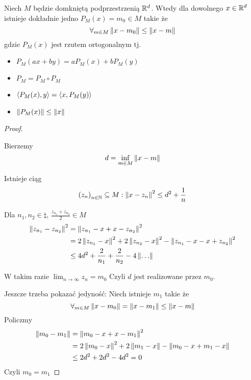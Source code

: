 \begin{lemma}
    Niech \( M \) będzie domkniętą podprzestrzenią \( \mathbb{R}^d \).
    Wtedy dla dowolnego \( x \in \mathbb{R}^d \) istnieje dokładnie jedno \( P_M(x) = m_0 \in M \) takie że
    \[
        \forall_{m \in M} \left\Vert x - m_0 \right\Vert \leq \left\Vert x - m \right\Vert
    \]
    gdzie \( P_M(x) \) jest rzutem ortogonalnym tj.
    \begin{itemize}
        \item \( P_M(ax + by) = aP_M(x) + bP_M(y) \)
        \item \( P_M = P_M \circ P_M \)
        \item \( \left\langle P_M(x), y\right\rangle = \left\langle x, P_M(y)\right\rangle\)
        \item \( \left\Vert P_M(x) \right\Vert \leq \left\Vert x \right\Vert \)
    \end{itemize}
\end{lemma}
\begin{proof} \( \)

    Bierzemy 
    \[
        d = \inf_{m \in M} \left\Vert x - m \right\Vert
    \]
    
    Istnieje ciąg
    \[
        \left(z_n\right)_{n \in \mathbb{N}} \subseteq M : \left\Vert x - z_n \right\Vert^2 \leq d^2 + \frac{1}{n}
    \]
    
    Dla \( n_1, n_2 \in \natural \), \( \frac{z_{n_1} + z_{n_2}}{2} \in M \)
    \begin{align*}
        \norm{z_{n_1} - z_{n_2}}^2
            &= \norm{z_{n_1} - x + x - z_{n_2}}^2 \\
            &= 2\norm{z_{n_1} - x}^2 + 2\norm{z_{n_2} - x}^2 
                - \norm{z_{n_1} - x - x + z_{n_2}}^2
            \\
            &\leq 4d^2 + \frac{2}{n_1} + \frac{2}{n_2} - 4\norm{\dots}
    \end{align*}
    
    W takim razie \( \lim_{n \rightarrow \infty} z_n = m_0 \)
    Czyli \( d \) jest realizowane przez \( m_0 \).
    
    Jeszcze trzeba pokazać jedyność:
    Niech istnieje \( m_1 \) takie że
    \[
        \forall_{m \in M} \left\Vert x - m_0 \right\Vert = \left\Vert x - m_1 \right\Vert \leq \left\Vert x - m \right\Vert
    \]
    Policzmy
    \begin{align*}
        \left\Vert m_0 - m_1 \right\Vert
            &= \left\Vert m_0 - x + x - m_1 \right\Vert^2 \\
            &= 2\left\Vert m_0 - x \right\Vert^2 + 2\left\Vert m_1 - x \right\Vert 
                - \left\Vert m_0 - x + m_1 - x \right\Vert \\
            &\leq 2d^2 + 2d^2 - 4d^2 = 0
    \end{align*}
    Czyli \( m_0 = m_1 \)

\end{proof}

